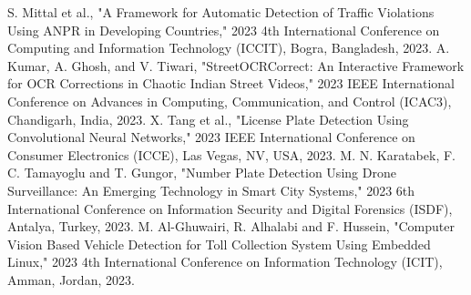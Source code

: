 \documentclass[conference]{IEEEtran}
\begin{document}
\begin{thebibliography}{00}
		 S. Mittal et al., "A Framework for Automatic Detection of Traffic Violations Using ANPR in Developing Countries," 2023 4th International Conference on Computing and Information Technology (ICCIT), Bogra, Bangladesh, 2023.
		 A. Kumar, A. Ghosh, and V. Tiwari, "StreetOCRCorrect: An Interactive Framework for OCR Corrections in Chaotic Indian Street Videos," 2023 IEEE International Conference on Advances in Computing, Communication, and Control (ICAC3), Chandigarh, India, 2023.
		 X. Tang et al., "License Plate Detection Using Convolutional Neural Networks," 2023 IEEE International Conference on Consumer Electronics (ICCE), Las Vegas, NV, USA, 2023.
		 M. N. Karatabek, F. C. Tamayoglu and T. Gungor, "Number Plate Detection Using Drone Surveillance: An Emerging Technology in Smart City Systems," 2023 6th International Conference on Information Security and Digital Forensics (ISDF), Antalya, Turkey, 2023.
		 M. Al-Ghuwairi, R. Alhalabi and F. Hussein, "Computer Vision Based Vehicle Detection for Toll Collection System Using Embedded Linux," 2023 4th International Conference on Information Technology (ICIT), Amman, Jordan, 2023.
	\end{thebibliography}
	
\end{document}
